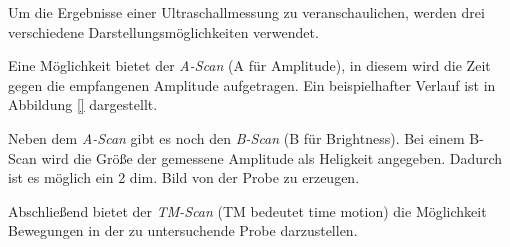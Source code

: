 Um die Ergebnisse einer Ultraschallmessung zu veranschaulichen, werden drei verschiedene
Darstellungsmöglichkeiten verwendet.

Eine Möglichkeit bietet der \emph{A-Scan} (A für Amplitude), in diesem
wird die Zeit gegen die empfangenen Amplitude aufgetragen.
Ein beispielhafter Verlauf ist in Abbildung \ref{} dargestellt.

Neben dem \emph{A-Scan} gibt es noch den \emph{B-Scan} (B für Brightness).
Bei einem B-Scan wird die Größe der gemessene Amplitude als Heligkeit
angegeben. Dadurch ist es möglich ein 2 dim. Bild von der Probe zu erzeugen.

Abschließend bietet der \emph{TM-Scan} (TM bedeutet time motion) die Möglichkeit
Bewegungen in der zu untersuchende Probe darzustellen.
